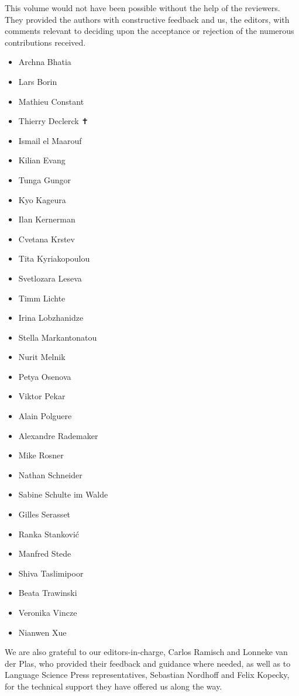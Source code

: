 \addchap{\lsAcknowledgementTitle} 
This volume would not have been possible without the help of the reviewers. They provided the authors with constructive feedback and us, the editors, with comments relevant to deciding upon the acceptance or rejection of the numerous contributions received.\largerpage

\begin{multicols}{2}
\begin{itemize}[itemsep=.5\itemsep]
    \item Archna Bhatia
    \item Lars Borin
    \item Mathieu Constant
    \item Thierry Declerck ✝
    \item Ismail el Maarouf
    \item Kilian Evang
    \item Tunga Gungor
    \item Kyo Kageura
    \item Ilan Kernerman
    \item Cvetana Krstev
    \item Tita Kyriakopoulou
    \item Svetlozara Leseva
    \item Timm Lichte
    \item Irina Lobzhanidze
    \item Stella Markantonatou
    \item Nurit Melnik
    \item Petya Osenova
    \item Viktor Pekar
    \item Alain Polguere
    \item Alexandre Rademaker
    \item Mike Rosner
    \item Nathan Schneider
    \item Sabine Schulte im Walde
    \item Gilles Serasset
    \item Ranka Stanković
    \item Manfred Stede
    \item Shiva Taslimipoor
    \item Beata Trawinski
    \item Veronika Vincze
    \item Nianwen Xue
\end{itemize}
\end{multicols}

We are also grateful to our editors-in-charge, Carlos Ramisch and Lonneke van der Plas, who provided their feedback and guidance where needed, as well as to Language Science Press representatives, Sebastian Nordhoff and Felix Kopecky, for the technical support they have offered us along the way.

